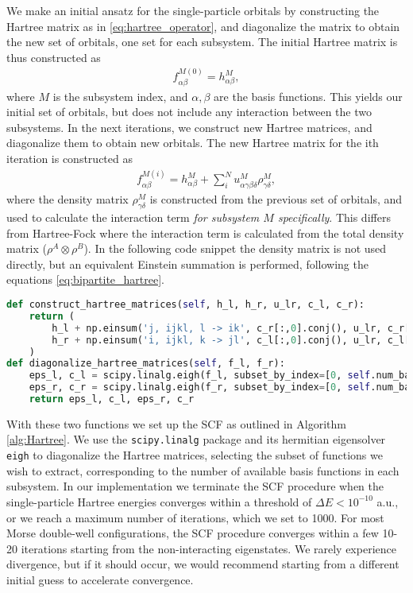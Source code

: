 \documentclass{subfiles}
\begin{document}
We make an initial ansatz for the single-particle orbitals by constructing the Hartree matrix as in \eqref{eq:hartree_operator}, and diagonalize the matrix to obtain the new set of orbitals, one set for each subsystem. The initial Hartree matrix is thus constructed as
\begin{align*}
    f_{\alpha\beta}^{M(0)} = h_{\alpha\beta}^M,
\end{align*}
where $M$ is the subsystem index, and $\alpha, \beta$ are the basis functions. This yields our initial set of orbitals, but does not include any interaction between the two subsystems. In the next iterations, we construct new Hartree matrices, and diagonalize them to obtain new orbitals. The new Hartree matrix for the ith iteration is constructed as
\begin{align*}
    f_{\alpha\beta}^{M(i)} = h_{\alpha\beta}^M + \sum_{i}^{N} u_{\alpha\gamma\beta\delta}^{M} \rho_{\gamma\delta}^{M},
\end{align*}
where the density matrix $\rho_{\gamma\delta}^{M}$ is constructed from the previous set of orbitals, and used to calculate the interaction term \emph{for subsystem $M$ specifically}. This differs from Hartree-Fock where the interaction term is calculated from the total density matrix ($\rho^A\otimes\rho^B$). In the following code snippet the density matrix is not used directly, but an equivalent Einstein summation is performed, following the equations \eqref{eq:bipartite_hartree}.
\begin{lstlisting}[language=Python]
def construct_hartree_matrices(self, h_l, h_r, u_lr, c_l, c_r):
    return (
        h_l + np.einsum('j, ijkl, l -> ik', c_r[:,0].conj(), u_lr, c_r[:,0]),
        h_r + np.einsum('i, ijkl, k -> jl', c_l[:,0].conj(), u_lr, c_l[:,0]),
    )
def diagonalize_hartree_matrices(self, f_l, f_r):
    eps_l, c_l = scipy.linalg.eigh(f_l, subset_by_index=[0, self.num_basis_l - 1])
    eps_r, c_r = scipy.linalg.eigh(f_r, subset_by_index=[0, self.num_basis_r - 1])
    return eps_l, c_l, eps_r, c_r
\end{lstlisting}
With these two functions we set up the SCF as outlined in Algorithm \ref{alg:Hartree}. We use the \texttt{scipy.linalg}\cite{2020SciPy-NMeth} package and its hermitian eigensolver \texttt{eigh} to diagonalize the Hartree matrices, selecting the subset of functions we wish to extract, corresponding to the number of available basis functions in each subsystem. In our implementation we terminate the SCF procedure when the single-particle Hartree energies converges within a threshold of $\Delta E < 10^{-10}$ a.u., or we reach a maximum number of iterations, which we set to 1000. For most Morse double-well configurations, the SCF procedure converges within a few 10-20 iterations starting from the non-interacting eigenstates. We rarely experience divergence, but if it should occur, we would recommend starting from a different initial guess to accelerate convergence. 
\end{document}

